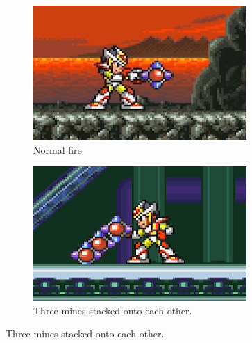 \begin{figure}[htp]
	\centering
	\begin{subfigure}[t]{0.4\linewidth}
		\includegraphics[width=\linewidth]{figures/X2/weapons/M_mine_1.png}	
		\caption{Normal fire}
	\end{subfigure}
	\begin{subfigure}[t]{0.4\linewidth}
		\centering
		\includegraphics[width=\linewidth]{figures/X2/weapons/M_mine_2.png}	
		\caption{Three mines stacked onto each other.}
	\end{subfigure}
\end{figure}
